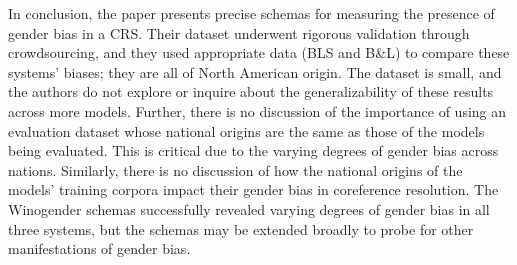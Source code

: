 \documentclass[11pt]{article}
\begin{document}
In conclusion, the paper presents precise schemas for measuring the presence of gender bias in a CRS. Their dataset
underwent rigorous validation through crowdsourcing, and they used appropriate data (BLS and B\&L) 
to compare these systems' biases; they are all of North American origin. The dataset is small,
and the authors do not explore or inquire about the generalizability of these results across more models. Further,
there is no discussion of the importance of using an evaluation dataset whose national origins are the same as those of the models being evaluated. 
This is critical due to the varying degrees of gender bias across nations. Similarly, 
there is no discussion of how the national origins of the models' training corpora impact their gender bias in 
coreference resolution. The Winogender schemas successfully revealed varying degrees of gender bias 
in all three systems, but the schemas may be extended broadly to probe for other manifestations of gender bias.
\end{document}
